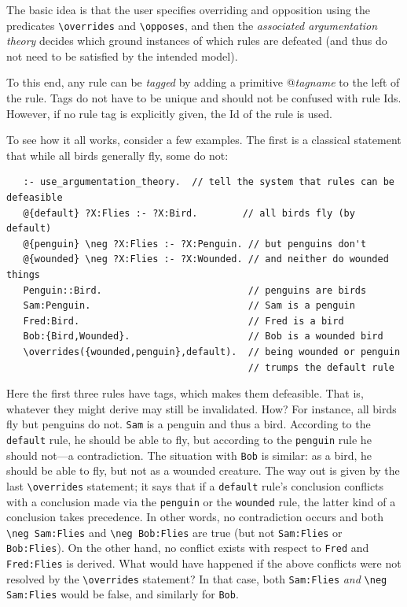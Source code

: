 \documentclass[11pt]{article}
\newcommand{\bs}{\textbackslash}
\begin{document}
The basic idea is that the user specifies overriding and
opposition using the predicates
\texttt{\bs{}overrides} and \texttt{\bs{}opposes},
and then the \emph{associated argumentation theory} decides which ground
instances of which rules are
defeated (and thus do not need to be satisfied by the intended model).  

To this end, any rule can be \emph{tagged} by adding
a primitive @{\emph{tagname}} to the left of the rule. Tags do not have to
be unique and should not be confused with rule Ids. However, if no rule tag
is explicitly given, the Id of the rule is used.

To see how it all works, consider a few examples. The first is a classical
statement that while all birds generally fly, some do not:
\begin{verbatim}
   :- use_argumentation_theory.  // tell the system that rules can be defeasible
   @{default} ?X:Flies :- ?X:Bird.        // all birds fly (by default)
   @{penguin} \neg ?X:Flies :- ?X:Penguin. // but penguins don't
   @{wounded} \neg ?X:Flies :- ?X:Wounded. // and neither do wounded things
   Penguin::Bird.                          // penguins are birds
   Sam:Penguin.                            // Sam is a penguin
   Fred:Bird.                              // Fred is a bird
   Bob:{Bird,Wounded}.                     // Bob is a wounded bird
   \overrides({wounded,penguin},default).  // being wounded or penguin
                                           // trumps the default rule
\end{verbatim}
Here the first three rules have tags, which makes them defeasible. That is,
whatever they might derive may still be invalidated. How? For instance,
all birds fly but penguins do not. \texttt{Sam} is a penguin and thus a
bird. According to the \texttt{default}
rule, he should be able to fly, but according 
to the \texttt{penguin} rule he should not---a contradiction. 
The situation with \texttt{Bob} is similar: as a bird, he should be able to
fly, but not as a wounded creature. The way out is given by the last
\texttt{\bs{}overrides} statement; it says that if a \texttt{default}
rule's conclusion conflicts with a conclusion made via the \texttt{penguin}
or the \texttt{wounded} rule, the latter kind of a conclusion takes precedence. In other words, no
contradiction occurs and both \texttt{\bs{}neg Sam:Flies}   
and \texttt{\bs{}neg Bob:Flies} are true (but not \texttt{Sam:Flies} or
\texttt{Bob:Flies}).  On the other hand, no conflict exists with respect to
\texttt{Fred} and \texttt{Fred:Flies} is derived. What would have happened
if the above conflicts were not resolved by the \texttt{\bs{}overrides}
statement? In that case, both \texttt{Sam:Flies} \emph{and}
\texttt{\bs{}neg Sam:Flies} would be false, and similarly for \texttt{Bob}.
\end{document}

